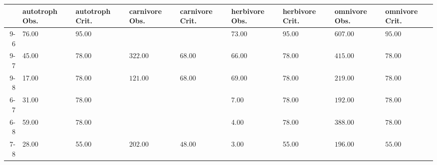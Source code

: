 \begin{table}[ht]
\centering
\begin{tabular}{rllllllll}
  \toprule
 & autotroph Obs. & autotroph Crit. & carnivore Obs. & carnivore Crit. & herbivore Obs. & herbivore Crit. & omnivore Obs. & omnivore Crit. \\ 
  \midrule
9-6 & 76.00 & 95.00 &  &  & 73.00 & 95.00 & \(\mathbf{607.00}\) & \(\mathbf{95.00}\) \\ 
  9-7 & 45.00 & 78.00 & \(\mathbf{322.00}\) & \(\mathbf{68.00}\) & 66.00 & 78.00 & \(\mathbf{415.00}\) & \(\mathbf{78.00}\) \\ 
  9-8 & 17.00 & 78.00 & \(\mathbf{121.00}\) & \(\mathbf{68.00}\) & 69.00 & 78.00 & \(\mathbf{219.00}\) & \(\mathbf{78.00}\) \\ 
  6-7 & 31.00 & 78.00 &  &  & 7.00 & 78.00 & \(\mathbf{192.00}\) & \(\mathbf{78.00}\) \\ 
  6-8 & 59.00 & 78.00 &  &  & 4.00 & 78.00 & \(\mathbf{388.00}\) & \(\mathbf{78.00}\) \\ 
  7-8 & 28.00 & 55.00 & \(\mathbf{202.00}\) & \(\mathbf{48.00}\) & 3.00 & 55.00 & \(\mathbf{196.00}\) & \(\mathbf{55.00}\) \\ 
   \bottomrule
\end{tabular}
\end{table}
